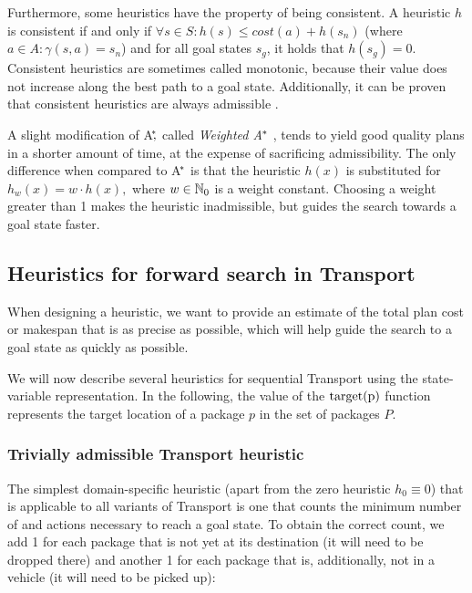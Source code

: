 Furthermore, some heuristics have the property of being consistent. A heuristic $h$ is consistent
if and only if $\forall s \in S : h(s) \leq cost(a) + h(s_n)$
(where $a \in A : \gamma(s, a) = s_n$) and for all goal states $s_g$, it holds that $h(s_g) = 0$.
Consistent heuristics are sometimes called monotonic, because their value
does not increase along the best path to a goal state. Additionally,
it can be proven that consistent heuristics are always admissible
\citep[Section~4.1]{Russell1995}.



A slight modification of A$^{\kern-.15em*}{\kern-.30em,}$ called \textit{Weighted A$^{\kern-.05em*}$} \citep{Pohl1970},
tends to yield good quality plans in a shorter amount of time,
at the expense of
sacrificing admissibility. The only difference
when compared to A$^{\kern-.15em*}$ is that the heuristic $h(x)$
is substituted for $h_w(x) = w \cdot h(x),$
where $w \in \mathbb{N}_0$ is a weight constant. Choosing a weight greater
than 1 makes the heuristic inadmissible,
but guides the search towards a goal state faster.


\subsection{Heuristics for forward search in Transport}\label{seq-heuristics}

When designing a heuristic, we want to provide an estimate
of the total plan cost or makespan
that is as precise as possible, which
will help guide the search to a goal state as quickly as
possible.

We will now describe several heuristics for sequential
Transport using the state-variable representation.
In the following, the value of the $\textrm{target(p)}$ function represents
the target location of a package $p$ in the set of packages $P$.

\subsubsection{Trivially admissible Transport heuristic}\label{sfa0}

The simplest domain-specific heuristic (apart from the zero heuristic $h_0 \equiv 0$) that is applicable to all variants of Transport
is one that counts the minimum number of \pickup{} and \drop{} actions
necessary to reach a goal state.
To obtain the correct count, we add 1 for each
package that is not yet at its destination (it will need to be dropped there) and another 1 for each package
that is, additionally, not in a vehicle (it will need to be picked up):

